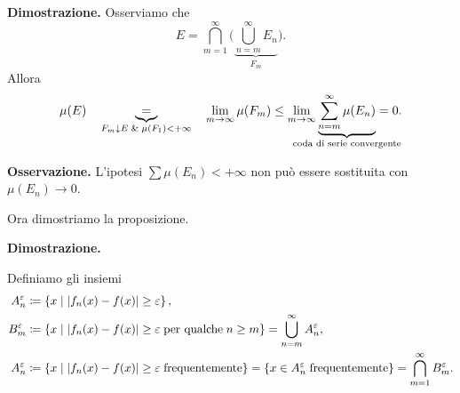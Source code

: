 \documentclass[a4paper, 12pt]{report}
\begin{document}
\textbf{Dimostrazione.}
Osserviamo che
%
$$
E = \bigcap_{m=1}^\infty \Big( \underbrace{\bigcup_{n=m}^\infty E_n}_{F_m} \Big).
$$
%
Allora
%
$$
\mu(E) \quad \underbrace{=}_{F_m \downarrow E \; \& \; \mu(F_1) < +\infty} \quad  \lim_{m \to \infty} \mu(F_m) \leq \lim_{m \to \infty} \underbrace{\sum_{n=m}^{\infty} \mu(E_n)}_{\mathclap{\text{coda di serie convergente}}} = 0.
$$
%

\textbf{Osservazione.}
L'ipotesi $\sum \mu(E_n) < +\infty$ non può essere sostituita con $\mu(E_n) \to 0$.

Ora dimostriamo la proposizione.

\textbf{Dimostrazione.}

Definiamo gli insiemi
\begin{align*}
A_n^\varepsilon & \coloneqq \left\{ x \;\middle|\; \left| f_n(x) - f(x) \right| \geq \varepsilon \right\}, \\
B_m^\varepsilon & \coloneqq \left\{ x \;\middle|\; \left| f_n(x) - f(x) \right| \geq \varepsilon \; \text{per qualche} \; n \geq m\right\} = \bigcup_{n = m}^\infty A_n^\varepsilon, \\
A_n^\varepsilon & \coloneqq \left\{ x \;\middle|\; \left| f_n(x) - f(x) \right| \geq \varepsilon \; \text{frequentemente}  \right\} = \left\{ x \in A_n^\varepsilon \; \text{frequentemente}  \right\} = \bigcap_{m = 1}^\infty B_m^\varepsilon.
\end{align*}
\end{document}
